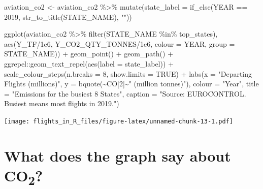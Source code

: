 \documentclass[
]{book}
\newenvironment{Shaded}{\begin{snugshade}}{\end{snugshade}}
\newcommand{\AttributeTok}[1]{\textcolor[rgb]{0.77,0.63,0.00}{#1}}
\newcommand{\ConstantTok}[1]{\textcolor[rgb]{0.00,0.00,0.00}{#1}}
\newcommand{\DecValTok}[1]{\textcolor[rgb]{0.00,0.00,0.81}{#1}}
\newcommand{\FloatTok}[1]{\textcolor[rgb]{0.00,0.00,0.81}{#1}}
\newcommand{\FunctionTok}[1]{\textcolor[rgb]{0.00,0.00,0.00}{#1}}
\newcommand{\NormalTok}[1]{#1}
\newcommand{\OtherTok}[1]{\textcolor[rgb]{0.56,0.35,0.01}{#1}}
\newcommand{\SpecialCharTok}[1]{\textcolor[rgb]{0.00,0.00,0.00}{#1}}
\newcommand{\StringTok}[1]{\textcolor[rgb]{0.31,0.60,0.02}{#1}}
\begin{document}
\begin{Shaded}
\begin{Highlighting}[]
\NormalTok{aviation\_co2 }\OtherTok{\textless{}{-}}\NormalTok{ aviation\_co2 }\SpecialCharTok{\%\textgreater{}\%} 
  \FunctionTok{mutate}\NormalTok{(}\AttributeTok{state\_label =} \FunctionTok{if\_else}\NormalTok{(YEAR }\SpecialCharTok{==} \DecValTok{2019}\NormalTok{, }\FunctionTok{str\_to\_title}\NormalTok{(STATE\_NAME), }\StringTok{""}\NormalTok{))}

\FunctionTok{ggplot}\NormalTok{(aviation\_co2 }\SpecialCharTok{\%\textgreater{}\%} 
         \FunctionTok{filter}\NormalTok{(STATE\_NAME }\SpecialCharTok{\%in\%}\NormalTok{ top\_states), }
       \FunctionTok{aes}\NormalTok{(Y\_TF}\SpecialCharTok{/}\FloatTok{1e6}\NormalTok{, Y\_CO2\_QTY\_TONNES}\SpecialCharTok{/}\FloatTok{1e6}\NormalTok{, }
           \AttributeTok{colour =}\NormalTok{ YEAR, }\AttributeTok{group =}\NormalTok{ STATE\_NAME)) }\SpecialCharTok{+}
  \FunctionTok{geom\_point}\NormalTok{() }\SpecialCharTok{+} 
  \FunctionTok{geom\_path}\NormalTok{() }\SpecialCharTok{+}
\NormalTok{  ggrepel}\SpecialCharTok{::}\FunctionTok{geom\_text\_repel}\NormalTok{(}\FunctionTok{aes}\NormalTok{(}\AttributeTok{label =}\NormalTok{ state\_label)) }\SpecialCharTok{+}
  \FunctionTok{scale\_colour\_steps}\NormalTok{(}\AttributeTok{n.breaks =} \DecValTok{8}\NormalTok{, }\AttributeTok{show.limits =} \ConstantTok{TRUE}\NormalTok{) }\SpecialCharTok{+}
  \FunctionTok{labs}\NormalTok{(}\AttributeTok{x =} \StringTok{"Departing Flights (millions)"}\NormalTok{, }
       \AttributeTok{y =} \FunctionTok{bquote}\NormalTok{(}\SpecialCharTok{\textasciitilde{}}\NormalTok{CO[}\DecValTok{2}\NormalTok{]}\SpecialCharTok{\textasciitilde{}}\StringTok{" (million tonnes)"}\NormalTok{),}
       \AttributeTok{colour =} \StringTok{"Year"}\NormalTok{,}
       \AttributeTok{title =} \StringTok{"Emissions for the busiest 8 States"}\NormalTok{,}
       \AttributeTok{caption =} \StringTok{"Source: EUROCONTROL. \textquotesingle{}Busiest\textquotesingle{} means most flights in 2019."}\NormalTok{)}
\end{Highlighting}
\end{Shaded}

\texttt{[image: flights\_in\_R\_files/figure-latex/unnamed-chunk-13-1.pdf]}

\hypertarget{what-does-the-graph-say-about-co2}{%
\section{\texorpdfstring{What does the graph say about CO\textsubscript{2}?}{What does the graph say about CO2?}}\label{what-does-the-graph-say-about-co2}}
\end{document}
